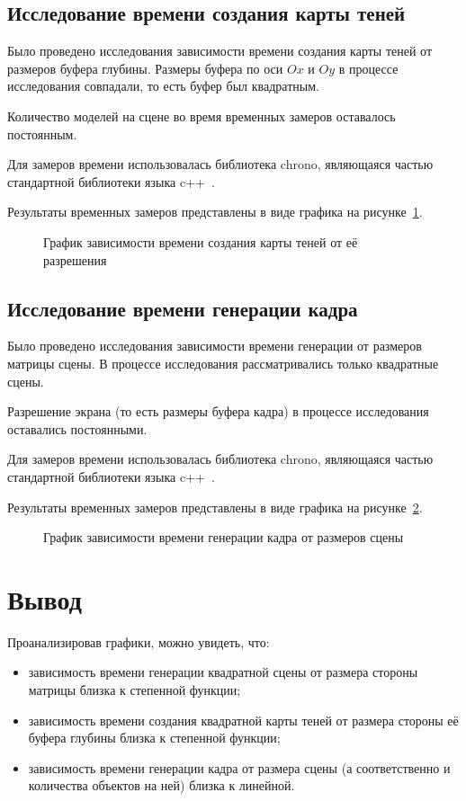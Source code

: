 \subsection*{Исследование времени создания карты теней}

Было проведено исследования зависимости времени создания карты теней от размеров буфера глубины. Размеры буфера по оси $Ox$ и $Oy$ в процессе исследования совпадали, то есть буфер был квадратным.

Количество моделей на сцене во время временных замеров оставалось постоянным.

Для замеров времени использовалась библиотека chrono, являющаяся частью стандартной библиотеки языка c++~\cite{cpp}.

Результаты временных замеров представлены в виде графика на рисунке~\ref{fig:smap_graph}.

\begin{figure}[h!]
  \centering
  
  \caption{График зависимости времени создания карты теней от её разрешения}
  \label{fig:smap_graph}
\end{figure}

\subsection*{Исследование времени генерации кадра}

Было проведено исследования зависимости времени генерации от размеров матрицы сцены. В процессе исследования рассматривались только квадратные сцены.

Разрешение экрана (то есть размеры буфера кадра) в процессе исследования оставались постоянными.

Для замеров времени использовалась библиотека chrono, являющаяся частью стандартной библиотеки языка c++~\cite{cpp}.

Результаты временных замеров представлены в виде графика на рисунке~\ref{fig:render_graph}.

\begin{figure}[h!]
  \centering
  
  \caption{График зависимости времени генерации кадра от размеров сцены}
  \label{fig:render_graph}
\end{figure}

\newpage

\section{Вывод}

Проанализировав графики, можно увидеть, что:
\begin{itemize}
  \item зависимость времени генерации квадратной сцены от размера стороны матрицы близка к степенной функции; 
  \item зависимость времени создания квадратной карты теней от размера стороны её буфера глубины близка к степенной функции; 
  \item зависимость времени генерации кадра от размера сцены (а соответственно и количества объектов на ней) близка к линейной.
\end{itemize}
